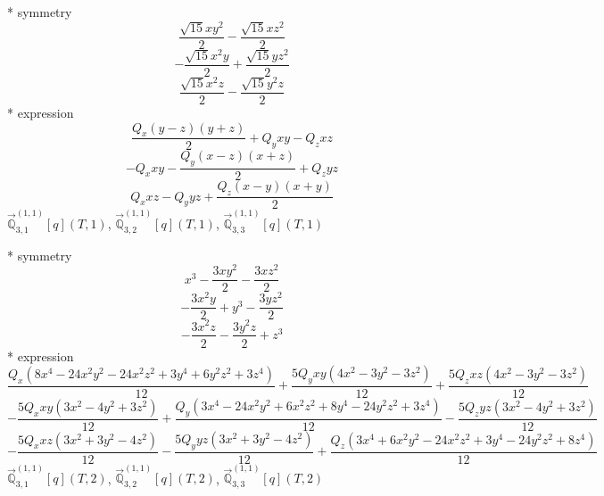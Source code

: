 \documentclass[fleqn,8pt]{jsarticle}
\begin{document}
\noindent\quad ** symmetry
\begin{dmath*}
\frac{\sqrt{15} x y^{2}}{2} - \frac{\sqrt{15} x z^{2}}{2}
\end{dmath*}
\begin{dmath*}
- \frac{\sqrt{15} x^{2} y}{2} + \frac{\sqrt{15} y z^{2}}{2}
\end{dmath*}
\begin{dmath*}
\frac{\sqrt{15} x^{2} z}{2} - \frac{\sqrt{15} y^{2} z}{2}
\end{dmath*}
\noindent\quad ** expression
\begin{dmath*}
\frac{Q_{x} \left(y - z\right) \left(y + z\right)}{2} + Q_{y} x y - Q_{z} x z
\end{dmath*}
\begin{dmath*}
- Q_{x} x y - \frac{Q_{y} \left(x - z\right) \left(x + z\right)}{2} + Q_{z} y z
\end{dmath*}
\begin{dmath*}
Q_{x} x z - Q_{y} y z + \frac{Q_{z} \left(x - y\right) \left(x + y\right)}{2}
\end{dmath*}
\noindent\quad $\vec{\mathbb{Q}}_{3,1}^{(1,1)}[q](T,1)$, $\vec{\mathbb{Q}}_{3,2}^{(1,1)}[q](T,1)$, $\vec{\mathbb{Q}}_{3,3}^{(1,1)}[q](T,1)$

\noindent\quad ** symmetry
\begin{dmath*}
x^{3} - \frac{3 x y^{2}}{2} - \frac{3 x z^{2}}{2}
\end{dmath*}
\begin{dmath*}
- \frac{3 x^{2} y}{2} + y^{3} - \frac{3 y z^{2}}{2}
\end{dmath*}
\begin{dmath*}
- \frac{3 x^{2} z}{2} - \frac{3 y^{2} z}{2} + z^{3}
\end{dmath*}
\noindent\quad ** expression
\begin{dmath*}
\frac{Q_{x} \left(8 x^{4} - 24 x^{2} y^{2} - 24 x^{2} z^{2} + 3 y^{4} + 6 y^{2} z^{2} + 3 z^{4}\right)}{12} + \frac{5 Q_{y} x y \left(4 x^{2} - 3 y^{2} - 3 z^{2}\right)}{12} + \frac{5 Q_{z} x z \left(4 x^{2} - 3 y^{2} - 3 z^{2}\right)}{12}
\end{dmath*}
\begin{dmath*}
- \frac{5 Q_{x} x y \left(3 x^{2} - 4 y^{2} + 3 z^{2}\right)}{12} + \frac{Q_{y} \left(3 x^{4} - 24 x^{2} y^{2} + 6 x^{2} z^{2} + 8 y^{4} - 24 y^{2} z^{2} + 3 z^{4}\right)}{12} - \frac{5 Q_{z} y z \left(3 x^{2} - 4 y^{2} + 3 z^{2}\right)}{12}
\end{dmath*}
\begin{dmath*}
- \frac{5 Q_{x} x z \left(3 x^{2} + 3 y^{2} - 4 z^{2}\right)}{12} - \frac{5 Q_{y} y z \left(3 x^{2} + 3 y^{2} - 4 z^{2}\right)}{12} + \frac{Q_{z} \left(3 x^{4} + 6 x^{2} y^{2} - 24 x^{2} z^{2} + 3 y^{4} - 24 y^{2} z^{2} + 8 z^{4}\right)}{12}
\end{dmath*}
\noindent\quad $\vec{\mathbb{Q}}_{3,1}^{(1,1)}[q](T,2)$, $\vec{\mathbb{Q}}_{3,2}^{(1,1)}[q](T,2)$, $\vec{\mathbb{Q}}_{3,3}^{(1,1)}[q](T,2)$
\end{document}
